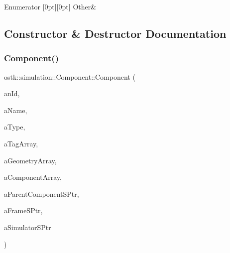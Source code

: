 \begin{DoxyEnumFields}{Enumerator}
[0pt][0pt]{}\mbox{\label{classostk_1_1simulation_1_1_component_a1d2ded63a8ab0bd81e27f25921be1e20a6311ae17c1ee52b36e68aaf4ad066387}} 
Other&\\
\hline

\end{DoxyEnumFields}


\subsection{Constructor \& Destructor Documentation}
\mbox{\label{classostk_1_1simulation_1_1_component_ab3711f34980c3fdb746ff83b9511a25c}} 
\subsubsection{\texorpdfstring{Component()}{Component()}\hspace{0.1cm}{\footnotesize\ttfamily [1/2]}}
{\footnotesize\ttfamily ostk\+::simulation\+::\+Component\+::\+Component (\begin{DoxyParamCaption}\item[{const String \&}]{an\+Id,  }\item[{const String \&}]{a\+Name,  }\item[{const \hyperlink{classostk_1_1simulation_1_1_component_a1d2ded63a8ab0bd81e27f25921be1e20}{Component\+::\+Type} \&}]{a\+Type,  }\item[{const Array$<$ String $>$ \&}]{a\+Tag\+Array,  }\item[{const Array$<$ Shared$<$ \hyperlink{classostk_1_1simulation_1_1component_1_1_geometry}{Geometry} $>$$>$ \&}]{a\+Geometry\+Array,  }\item[{const Array$<$ Shared$<$ \hyperlink{classostk_1_1simulation_1_1_component}{Component} $>$$>$ \&}]{a\+Component\+Array,  }\item[{const Shared$<$ \hyperlink{classostk_1_1simulation_1_1utilities_1_1_component_holder}{Component\+Holder} $>$ \&}]{a\+Parent\+Component\+S\+Ptr,  }\item[{const Shared$<$ const Frame $>$ \&}]{a\+Frame\+S\+Ptr,  }\item[{const Shared$<$ const \hyperlink{classostk_1_1simulation_1_1_simulator}{Simulator} $>$ \&}]{a\+Simulator\+S\+Ptr }\end{DoxyParamCaption})}


